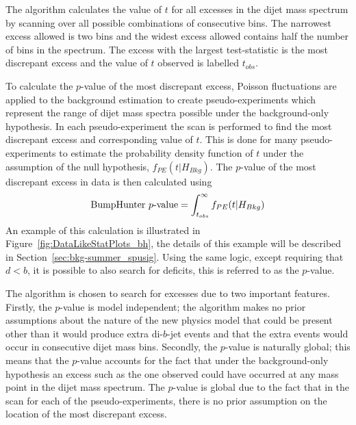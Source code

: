 The \bh{} algorithm calculates the value of $t$ for all excesses in the dijet mass spectrum
by scanning over all possible combinations of consecutive bins.
The narrowest excess allowed is two bins and the widest excess allowed contains half the number of bins in the spectrum.
The excess with the largest \bh{} test-statistic is the most discrepant excess and the value of $t$ observed is labelled $t_{obs}$.

To calculate the \mbox{$p$-value} of the most discrepant excess,
Poisson fluctuations are applied to the background estimation to create pseudo-experiments
which represent the range of dijet mass spectra possible under the background-only hypothesis.
In each pseudo-experiment the \bh{} scan is performed to find the most discrepant excess and corresponding value of $t$.
This is done for many pseudo-experiments to estimate the probability density function of $t$ under the assumption of the null hypothesis, $f_{PE}(t| H_{Bkg})$.
The \bh{} \mbox{$p$-value} of the most discrepant excess in data is then calculated using
\begin{equation}
  \text{BumpHunter{}}~p\text{-value} = \int_{t_{obs}}^\infty f_{PE}(t | H_{Bkg})
\end{equation}
An example of this calculation is illustrated in Figure~\ref{fig:DataLikeStatPlots_bh},
the details of this example will be described in Section~\ref{sec:bkg-summer_spusig}.
Using the same logic, except requiring that $d < b$, it is possible to also search for deficits,
this is referred to as the \dhunt{} \mbox{$p$-value}.

The \bh{} algorithm is chosen to search for excesses due to two important features.
Firstly, the \bh{} \mbox{$p$-value} is model independent;
the algorithm makes no prior assumptions about the nature of the new physics model that could be present
other than it would produce extra di-$b$-jet events and that the extra events would occur in consecutive dijet mass bins.
Secondly, the \bh{} \mbox{$p$-value} is naturally global;
this means that the \mbox{$p$-value} accounts for the fact that under the background-only hypothesis
an excess such as the one observed could have occurred at any mass point in the dijet mass spectrum.
The \bh{} $p$-value is global due to the fact that in the \bh{} scan for each of the pseudo-experiments, there is no prior assumption on the location of the most discrepant excess.


